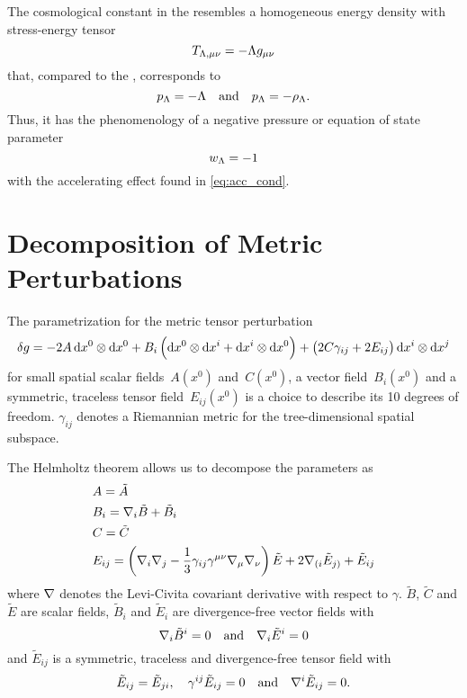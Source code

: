 The cosmological constant in the  resembles a homogeneous energy density with stress-energy tensor
\begin{equation}
	T_{\Lambda\textnormal{,}\mu\nu} = - \Lambda g_{\mu\nu}
\end{equation}
that, compared to the , corresponds to
\begin{equation}
	p_\Lambda = -\Lambda \quad \text{and} \quad p_\Lambda = -\rho_\Lambda
	\mathpunct{.}
\end{equation}
Thus, it has the phenomenology of a negative pressure or equation of state parameter
\begin{equation}
	w_\Lambda = -1
\end{equation}
with the accelerating effect found in \eqref{eq:acc_cond}.


\section{Decomposition of Metric Perturbations}\label{app:deriv_decompose}

The parametrization for the metric tensor perturbation
\begin{align}
	\delta g = -2A \dxdx{0}{0} + B_i\del{\dxdx{0}{i} + \dxdx{i}{0}} + \del{2C\gamma_{ij} + 2E_{ij}}\dxdx{i}{j}
\end{align}
for small spatial scalar fields~\(A(x^0)\) and~\(C(x^0)\), a vector field~\(B_i(x^0)\) and a symmetric, traceless tensor field~\(E_{ij}(x^0)\) is a choice to describe its 10 degrees of freedom. \(\gamma_{ij}\) denotes a Riemannian metric for the tree-dimensional spatial subspace.

The Helmholtz theorem allows us to decompose the parameters as \autocite{Schuller,Weinberg}
\begin{align}
	&A = \tilde{A}\\
	&B_i = \covd_i \tilde{B} + \tilde{B}_i \\
	&C = \tilde{C}\\
	&E_{ij} = \del{\covd_i\covd_j-\frac{1}{3}\gamma_{ij}\gamma^{\mu\nu}\covd_\mu\covd_\nu}\tilde{E} + 2 \covd_{(i}\tilde{E}_{j)} + \tilde{E}_{ij}
\end{align}
where \(\nabla\) denotes the Levi-Civita covariant derivative with respect to \(\gamma\). \(\tilde{B}\), \(\tilde{C}\) and \(\tilde{E}\) are scalar fields, \(\tilde{B}_i\) and \(\tilde{E}_i\) are divergence-free vector fields with
\begin{equation}
	\nabla_i \tilde{B}^i = 0 \quad \text{and} \quad \nabla_i \tilde{E}^i = 0
\end{equation}
and \(\tilde{E}_{ij}\) is a symmetric, traceless and divergence-free tensor field with
\begin{equation}\label{eq:tt_gauge_cond}
	\tilde{E}_{ij} = \tilde{E}_{ji} \mathpunct{,} \quad \gamma^{ij}\tilde{E}_{ij} = 0 \quad \text{and} \quad \nabla^i \tilde{E}_{ij} = 0
	\mathpunct{.}
\end{equation}

